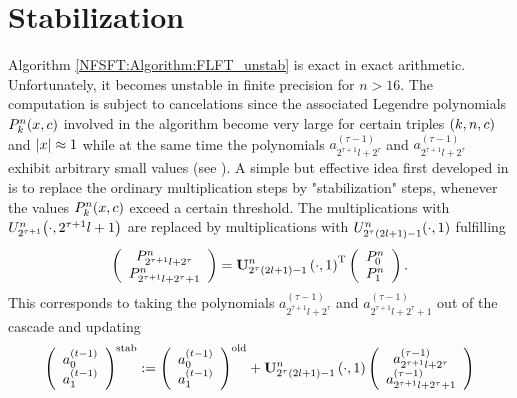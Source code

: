 \section{Stabilization}
\label{DSFT:Stabilization}
Algorithm \ref{NFSFT:Algorithm:FLFT_unstab} is exact in exact arithmetic. Unfortunately, it becomes unstable in finite precision for $n > 16$. The computation is subject to cancelations since the associated Legendre polynomials $P_{k}^n{\hspace{-0.4ex}}\left(x,c\right)$ involved in the algorithm become very large for certain triples $\left(k,n,c\right)$ and $\left\vert x\right\vert \approx 1$ while at the same time the polynomials $a_{2^{\tau+1}l+2^{\tau}}^{(\tau-1)}$ and $a_{2^{\tau+1}l+2^{\tau}}^{(\tau-1)}$ exhibit arbitrary small values (see \cite{kupo02}). A simple but effective idea first developed in \cite{postta97} is to replace the ordinary multiplication steps by "stabilization" steps, whenever the values $P_{k}^n{\hspace{-0.4ex}}\left(x,c\right)$ exceed a certain threshold. The multiplications with $U_{2^{\tau+1}}^n{\hspace{-0.4ex}}\left(\cdot,2^{\tau+1}l+1\right)$ are replaced by multiplications with $U_{2^{\tau}(2l+1)-1}^n{\hspace{-0.4ex}}\left(\cdot,1\right)$ fulfilling
$$
	\left(\begin{array}{c}
	  P_{2^{\tau+1}l+2^{\tau}}^{n}\\ 
	  P_{2^{\tau+1}l+2^{\tau}+1}^{n}
	\end{array}\right)
	=
	\mathbf{U}_{2^{\tau}(2l+1)-1}^{n}\left(\cdot,1\right)^{\text{\rm{T}}}
		\left(\begin{array}{c}
	  P_{0}^{n}\\
	  P_{1}^{n}
	\end{array}\right).
$$
This corresponds to taking the polynomials $a_{2^{\tau+1}l+2^{\tau}}^{(\tau-1)}$ and $a_{2^{\tau+1}l+2^{\tau}+1}^{(\tau-1)}$ out of the cascade and updating
\begin{equation}
  \label{NFSFT:StabilizationStep}
	\left(\begin{array}{c}
	  a_{0}^{(t-1)}\\
	  a_{1}^{(t-1)}
	\end{array}\right)^{\text{stab}}
	:=
	\left(\begin{array}{c}
	  a_{0}^{(t-1)}\\
	  a_{1}^{(t-1)}
	\end{array}\right)^{\text{old}}
  +
	\mathbf{U}_{2^{\tau}(2l+1)-1}^{n}\left(\cdot,1\right)
	\left(\begin{array}{c}
	  a_{2^{\tau+1}l+2^{\tau}}^{(\tau-1)}\\
	  a_{2^{\tau+1}l+2^{\tau}+1}^{(\tau-1)}
	\end{array}\right)  
\end{equation}
